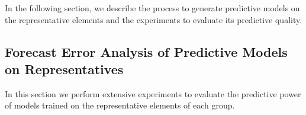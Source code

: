 
In the following section, we describe the process to generate predictive models on the representative elements and the experiments to evaluate its predictive quality.

\subsection{Forecast Error Analysis of Predictive Models on Representatives}
\label{Sec:AnalyzePredictorRepresentatives}

In this section we perform extensive experiments to evaluate the predictive power of models trained on the representative elements of each group. 

